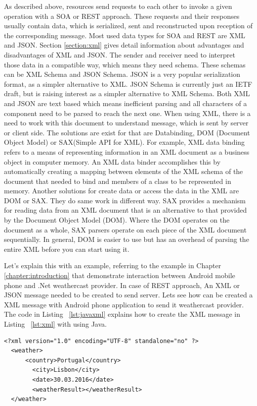 As described above, resources send requests to each other to invoke a given operation with a SOA or REST approach. These requests and their responses usually contain data, which is serialized, sent and reconstructed upon reception of the corresponding message. Most used data types for SOA and REST are XML and JSON. Section \ref{section:xml} gives detail information about advantages and disadvantages of XML and JSON. The sender and receiver need to interpret those data in a compatible way, which means they need schema. These schemas can be XML Schema and JSON Schema. JSON is a very popular serialization format, as a simpler alternative to XML. JSON Schema is currently just an IETF draft\citep{thesis:arch1}, but is raising interest as a simpler alternative to XML Schema. Both XML and JSON are text based which means inefficient parsing and all characters of a component need to be parsed to reach the next one.
When using XML, there is a need to work with this document to understand message, which is sent by server or client side. The solutions are exist for that are Databinding, DOM (Document Object Model) or SAX(Simple API for XML)\citep{thesis:arch20}. For example, XML data binding refers to a means of representing information in an XML document as a business object in computer memory. An XML data binder accomplishes this by automatically creating a mapping between elements of the XML schema of the document that needed to bind and members of a class to be represented in memory. Another solutions for create data or access the data in the XML are DOM or SAX. They do same work in different way. SAX provides a mechanism for reading data from an XML document that is an alternative to that provided by the Document Object Model (DOM). Where the DOM operates on the document as a whole, SAX parsers operate on each piece of the XML document sequentially. In general, DOM is easier to use but has an overhead of parsing the entire XML before you can start using it.

Let's explain this with an example, referring to the example in Chapter \ref{chapter:introduction} that demonstrate interaction between Android mobile phone and .Net weathercast provider. In case of REST approach, An XML or JSON message needed to be created to send server. Lets see how can be created a XML message with Android phone application to send it weathercast provider. The code in Listing ~\ref{lst:javaxml} explains how to create the XML message in Listing ~\ref{lst:xml} with using Java.

\begin{lstlisting}[caption=Example XML message to send weathercast provider, label=lst:xml]
  <?xml version="1.0" encoding="UTF-8" standalone="no" ?>
  <weather>
      <country>Portugal</country>
  		<city>Lisbon</city>
  		<date>30.03.2016</date>
  		<weatherResult></weatherResult>
  </weather>
\end{lstlisting}

